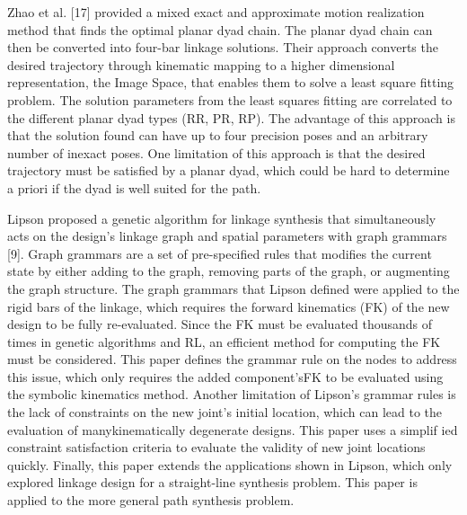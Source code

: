Zhao et al. [17] provided a mixed exact and approximate motion realization method that finds the optimal planar dyad chain. The planar dyad chain can then be converted into four-bar linkage solutions. Their approach converts the desired trajectory through kinematic mapping to a higher dimensional representation, the Image Space, that enables them to solve a least square fitting problem. The solution parameters from the least squares fitting are correlated to the different planar dyad types (RR, PR, RP). The advantage of this approach is that the solution found can have up to four precision poses and an arbitrary number of inexact poses. One limitation of this approach is that the desired trajectory must be satisfied by a planar dyad, which could be hard to determine a priori if the dyad is well suited for the path. 

Lipson proposed a genetic algorithm for linkage synthesis that simultaneously acts on the design’s linkage graph and spatial parameters with graph grammars [9]. Graph grammars are a set of pre-specified rules that modifies the current state by either adding to the graph, removing parts of the graph, or augmenting the graph structure. The graph grammars that Lipson defined were applied to the rigid bars of the linkage, which requires the forward kinematics (FK) of the new design to be fully re-evaluated. Since the FK must be evaluated thousands of times in genetic algorithms and RL, an efficient method for computing the FK must be considered. This paper defines the grammar rule on the nodes to address this issue, which only requires the added component’sFK to be evaluated using the symbolic kinematics method. Another limitation of Lipson’s grammar rules is the lack of constraints on the new joint’s initial location, which can lead to the evaluation of manykinematically degenerate designs. This paper uses a simplif ied constraint satisfaction criteria to evaluate the validity of new joint locations quickly. Finally, this paper extends the applications shown in Lipson, which only explored linkage design for a straight-line synthesis problem. This paper is applied to the more general path synthesis problem.

